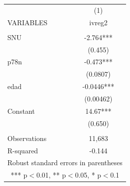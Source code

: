 \documentclass[]{article}
\begin{document}
\begin{tabular}{lc} \hline
 & (1) \\
VARIABLES & ivreg2 \\ \hline
 &  \\
SNU & -2.764*** \\
 & (0.455) \\
p78n & -0.473*** \\
 & (0.0807) \\
edad & -0.0446*** \\
 & (0.00462) \\
Constant & 14.67*** \\
 & (0.650) \\
 &  \\
Observations & 11,683 \\
 R-squared & -0.144 \\ \hline
\multicolumn{2}{c}{ Robust standard errors in parentheses} \\
\multicolumn{2}{c}{ *** p$<$0.01, ** p$<$0.05, * p$<$0.1} \\
\end{tabular}
\end{document}
